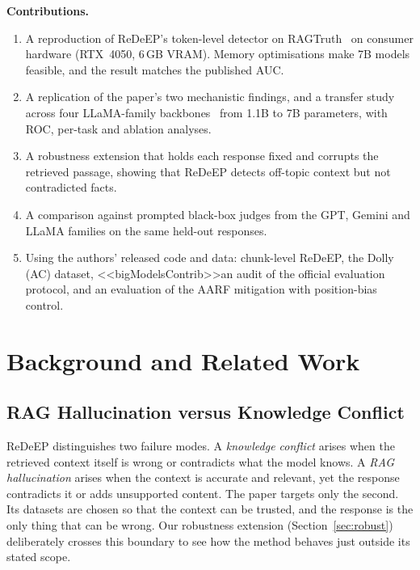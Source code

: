 \documentclass[conference]{IEEEtran}
\begin{document}
\textbf{Contributions.}
\begin{enumerate}
\item A reproduction of ReDeEP's token-level detector on RAGTruth~\cite{niu2024ragtruth} on consumer hardware (RTX~4050, 6\,GB VRAM). Memory optimisations make 7B models feasible, and the result matches the published AUC.
\item A replication of the paper's two mechanistic findings, and a transfer study across four LLaMA-family backbones~\cite{touvron2023llama2} from 1.1B to 7B parameters, with ROC, per-task and ablation analyses.
\item A robustness extension that holds each response fixed and corrupts the retrieved passage, showing that ReDeEP detects off-topic context but not contradicted facts.
\item A comparison against prompted black-box judges from the GPT, Gemini and LLaMA families on the same held-out responses.
\item Using the authors' released code and data: chunk-level ReDeEP, the Dolly (AC) dataset, <<bigModelsContrib>>an audit of the official evaluation protocol, and an evaluation of the AARF mitigation with position-bias control.
\end{enumerate}

\section{Background and Related Work}
\subsection{RAG Hallucination versus Knowledge Conflict}
ReDeEP distinguishes two failure modes. A \emph{knowledge conflict} arises when the retrieved context itself is wrong or contradicts what the model knows. A \emph{RAG hallucination} arises when the context is accurate and relevant, yet the response contradicts it or adds unsupported content. The paper targets only the second. Its datasets are chosen so that the context can be trusted, and the response is the only thing that can be wrong. Our robustness extension (Section~\ref{sec:robust}) deliberately crosses this boundary to see how the method behaves just outside its stated scope.
\end{document}
